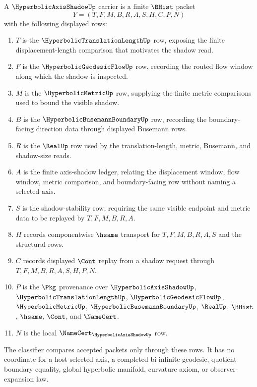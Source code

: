 \begin{definition}
\label{def:hyperbolic-axis-shadow-carrier}
A $\HyperbolicAxisShadowUp$ carrier is a finite $\BHist$ packet
$$
Y=(T,F,M,B,R,A,S,H,C,P,N)
$$
with the following displayed rows:
\begin{enumerate}
\item $T$ is the $\HyperbolicTranslationLengthUp$ row, exposing the finite displacement-length comparison that motivates the shadow read.
\item $F$ is the $\HyperbolicGeodesicFlowUp$ row, recording the routed flow window along which the shadow is inspected.
\item $M$ is the $\HyperbolicMetricUp$ row, supplying the finite metric comparisons used to bound the visible shadow.
\item $B$ is the $\HyperbolicBusemannBoundaryUp$ row, recording the boundary-facing direction data through displayed Busemann rows.
\item $R$ is the $\RealUp$ row used by the translation-length, metric, Busemann, and shadow-size reads.
\item $A$ is the finite axis-shadow ledger, relating the displacement window, flow window, metric comparison, and boundary-facing row without naming a selected axis.
\item $S$ is the shadow-stability row, requiring the same visible endpoint and metric data to be replayed by $T,F,M,B,R,A$.
\item $H$ records componentwise $\hsame$ transport for $T,F,M,B,R,A,S$ and the structural rows.
\item $C$ records displayed $\Cont$ replay from a shadow request through $T,F,M,B,R,A,S,H,P,N$.
\item $P$ is the $\Pkg$ provenance over $\HyperbolicAxisShadowUp$, $\HyperbolicTranslationLengthUp$, $\HyperbolicGeodesicFlowUp$, $\HyperbolicMetricUp$, $\HyperbolicBusemannBoundaryUp$, $\RealUp$, $\BHist$, $\hsame$, $\Cont$, and $\NameCert$.
\item $N$ is the local $\NameCert_{\HyperbolicAxisShadowUp}$ row.
\end{enumerate}
The classifier compares accepted packets only through these rows. It has no coordinate for a host selected axis, a completed bi-infinite geodesic, quotient boundary equality, global hyperbolic manifold, curvature axiom, or observer-expansion law.
\end{definition}

